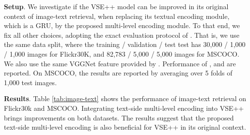 \textbf{Setup}.
We investigate if the VSE++ model \cite{faghri2017vse} can be improved in its original context of image-text retrieval, when replacing its textual encoding module, which is a GRU, by the proposed multi-level encoding module. To that end, we fix all other choices, adopting the exact evaluation protocol of \cite{faghri2017vse}. That is, we use the same data split, where the training / validation / test test has 30,000 / 1,000 / 1,000 images for Flickr30K, and 82,783 / 5,000 / 5,000 images for MSCOCO. We also use the same VGGNet feature provided by \cite{faghri2017vse}. Performance of ,  and  are reported. On MSCOCO, the results are reported by averaging over 5 folds of 1,000 test images.


\textbf{Results}.
Table \ref{tab:image-text} shows the performance of image-text retrieval on Flickr30k and MSCOCO. Integrating text-side multi-level encoding into VSE++ brings improvements on both datasets.  The results suggest that the proposed text-side multi-level encoding is also beneficial for VSE++ in its original context.

